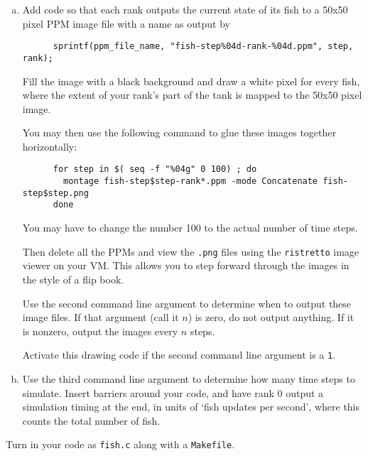 \documentclass[11pt]{article}
\begin{document}
\begin{enumerate}[a)]
  \item Add code so that each rank outputs the current state of its
    fish to a 50x50 pixel PPM image file with a name as output by
    \begin{lstlisting}
      sprintf(ppm_file_name, "fish-step%04d-rank-%04d.ppm", step, rank);
    \end{lstlisting}
    Fill the image with a black background and draw a white pixel for
    every fish, where the extent of your rank's part of the tank is
    mapped to the 50x50 pixel image.

    You may then use the following command to glue these images
    together horizontally:
    \begin{lstlisting}
      for step in $( seq -f "%04g" 0 100) ; do
        montage fish-step$step-rank*.ppm -mode Concatenate fish-step$step.png
      done
    \end{lstlisting}%
    You may have to change the number 100 to the actual number of time
    steps.

    Then delete all the PPMs and view the \texttt{.png} files using
    the \texttt{ristretto} image viewer on your VM. This allows you to
    step forward through the images in the style of a flip book.

    Use the second command line argument to determine when to output
    these image files. If that argument (call it $n$) is zero, do not
    output anything.  If it is nonzero, output the images every $n$
    steps.

    Activate this drawing code if the second command line argument is
    a \texttt{1}.

  \item Use the third command line argument to determine how many time
    steps to simulate. Insert barriers around your code, and have 
    rank 0 output a simulation timing at the end, in units of `fish
    updates per second', where this counts the total number of fish.
\end{enumerate}
Turn in your code as \texttt{fish.c} along with a \texttt{Makefile}.
\end{document}
